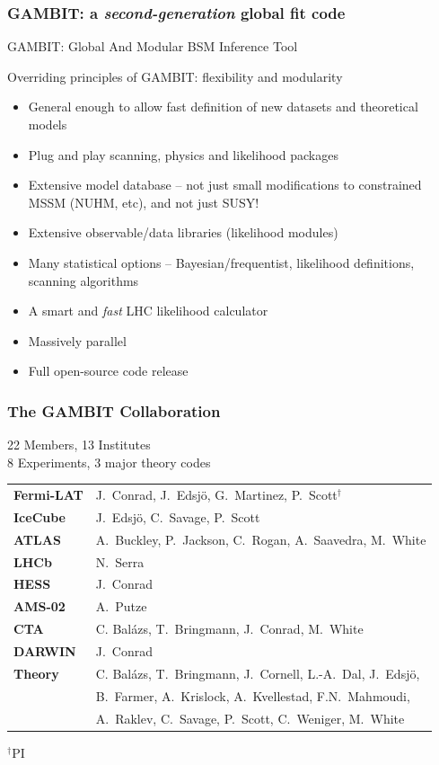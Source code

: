 \documentclass[xcolor=dvipsnames]{beamer}
\begin{document}
\begin{frame}
\frametitle{\textbf{GAMBIT}: a \textit{second-generation} global fit code}

GAMBIT: \alert{G}lobal \alert{A}nd \alert{M}odular \alert{B}SM \alert{I}nference \alert{T}ool
\vspace{5mm}

Overriding principles of GAMBIT: flexibility and modularity
\begin{itemize}
\item General enough to allow fast definition of new datasets and theoretical models
\item Plug and play scanning, physics and likelihood packages
\item Extensive model database -- not just small modifications to constrained MSSM (NUHM, etc), and not just SUSY!
\item Extensive observable/data libraries (likelihood modules)
\item Many statistical options -- Bayesian/frequentist, likelihood definitions, scanning algorithms
\item A smart and \textit{fast} LHC likelihood calculator
\item Massively parallel
\item Full open-source code release
\end{itemize}

\end{frame}


\begin{frame}
\frametitle{The GAMBIT Collaboration}

22 Members, 13 Institutes \\
8 Experiments, 3 major theory codes \vspace{3mm}

\begin{tabular}{l l}
\textbf{Fermi-LAT} & \small J.\ Conrad, J.\ Edsj\"o, G.\ Martinez, P.\ Scott{\footnotesize$^\dagger$}\\
\textbf{IceCube} & \small J.\ Edsj\"o, C.\ Savage, P.\ Scott\\
\textbf{ATLAS} & \small A.\ Buckley, P.\ Jackson, C.\ Rogan, A.\ Saavedra, M.\ White\\
\textbf{LHCb} & \small N.\ Serra\\
\textbf{HESS} & \small J.\ Conrad \\
\textbf{AMS-02} & \small A.\ Putze\\
\textbf{CTA} & \small C. Bal\'azs, T.\ Bringmann, J.\ Conrad, M.\ White\\
\textbf{DARWIN} & \small J.\ Conrad\\
\textbf{Theory} & \small C. Bal\'azs, T.\ Bringmann, J.\ Cornell, L.-A.\ Dal, J.\ Edsj\"o, \\
                & \small B.\ Farmer, A.\ Krislock, A.\ Kvellestad, F.N.\ Mahmoudi, \\
                & \small A.\ Raklev, C.\ Savage, P.\ Scott, C.\ Weniger, M.\ White \\	
\end{tabular}
{\tiny$^\dagger$PI}

\end{frame}
\end{document}
